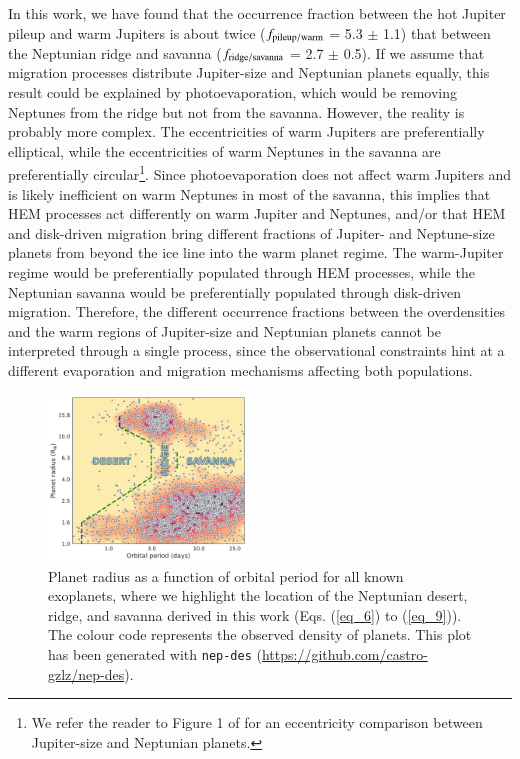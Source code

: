 \documentclass[]{aa}
\begin{document}
In this work, we have found that the occurrence fraction between the hot Jupiter pileup and warm Jupiters is about twice ($f_{\rm pileup/warm}$ = 5.3 $\pm$ 1.1)  that between the Neptunian ridge and savanna ($f_{\rm ridge/savanna}$ = 2.7 $\pm$ 0.5). If we assume that migration processes distribute Jupiter-size and Neptunian planets equally, this result could be explained by photoevaporation, which would be removing Neptunes from the ridge but not from the savanna. However, the reality is probably more complex. The eccentricities of warm Jupiters are preferentially elliptical, while the eccentricities of warm Neptunes in the savanna are preferentially circular\footnote{We refer the reader to Figure 1 of \citet{2020A&A...635A..37C} for an eccentricity comparison between Jupiter-size and Neptunian planets.}. Since photoevaporation does not affect warm Jupiters and is likely inefficient on warm Neptunes in most of the savanna, this implies that HEM processes act differently on warm Jupiter and Neptunes, and/or that HEM and disk-driven migration bring different fractions of Jupiter- and Neptune-size planets from beyond the ice line into the warm planet regime. The warm-Jupiter regime would be preferentially populated through HEM processes, while the Neptunian savanna would be preferentially populated through disk-driven migration. Therefore, the different occurrence fractions between the overdensities and the warm regions of Jupiter-size and Neptunian planets cannot be interpreted through a single process, since the observational constraints hint at a different evaporation and migration mechanisms affecting both populations.


\begin{figure}
    \centering
    \includegraphics[width=0.47\textwidth]{logR_vs_logP_all.pdf}
    \caption{Planet radius as a function of orbital period for all known exoplanets, where we highlight the location of the Neptunian desert, ridge, and savanna derived in this work (Eqs. (\ref{eq_6}) to (\ref{eq_9})). The colour code represents the observed density of planets. This plot has been generated with \texttt{nep-des} (\url{https://github.com/castro-gzlz/nep-des}).}

    \label{fig:Per_Rad}
\end{figure}
\end{document}
